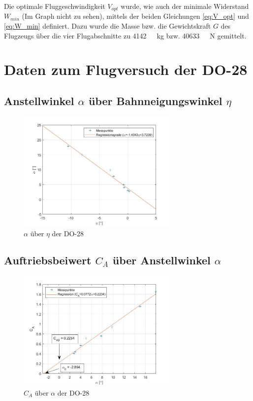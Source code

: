 Die optimale Fluggeschwindigkeit $V_{opt}$ wurde, wie auch der minimale Widerstand $W_{min}$ (Im Graph nicht zu sehen), mittels der beiden Gleichungen \ref{eq:V_opt} und \ref{eq:W_min} definiert. Dazu wurde die Masse bzw. die Gewichtskraft $G$ des Flugzeugs über die vier Flugabschnitte zu \SI{4142}{\ \kilogram} bzw. \SI{40633}{\ \newton} gemittelt.

\section{Daten zum Flugversuch der DO-28}

\subsection{Anstellwinkel $\alpha$ über Bahnneigungswinkel $\eta$}

\begin{figure}[H]
	\centering	\includegraphics[width=0.7\textwidth]{./Bilder/alpha_eta_plot.jpg}
	\caption{$\alpha$ über $\eta$ der DO-28}
	\label{fig:alpha_eta_DO28}
\end{figure}

\subsection{Auftriebsbeiwert $C_{A}$ über Anstellwinkel $\alpha$}

\begin{figure}[H]
	\centering	\includegraphics[width=0.7\textwidth]{./Bilder/CA_alpha_plot.jpg}
	\caption{$C_{A}$ über $\alpha$ der DO-28}
	\label{fig:CA_alpha_DO28}
\end{figure}

